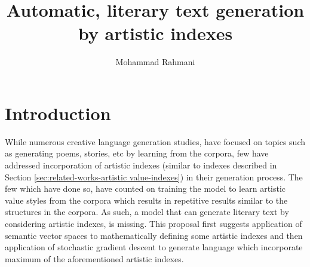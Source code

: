 \documentclass{article}
\begin{document}
	
	\title{Automatic, literary text generation by artistic indexes}
	\author{Mohammad Rahmani}
	\date{}
	\maketitle
	
	\section{Introduction} \label{sec:introduction}
	While numerous creative language generation studies, have focused on topics such as generating poems, stories, etc by learning from the corpora, few have addressed incorporation of artistic indexes (similar to indexes described in Section \ref{sec:related-works-artistic value-indexes}) in their generation process. The few which have done so, have counted on training the model to learn artistic value styles from the corpora which results in repetitive results similar to the structures in the corpora. As such, a model that can generate literary text by considering artistic indexes, is missing. This proposal first suggests application of semantic vector spaces to mathematically defining some artistic indexes and then application of stochastic gradient descent to generate language which incorporate maximum of the aforementioned artistic indexes. 
	
\end{document}

